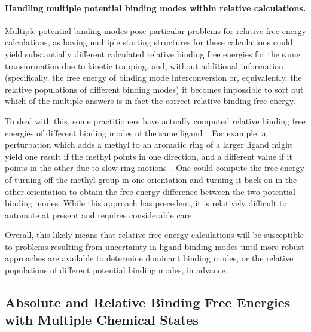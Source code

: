 \documentclass[9pt,bestpractices]{livecoms}
\begin{document}
\paragraph{Handling multiple potential binding modes within relative calculations.}
Multiple potential binding modes pose particular problems for relative free energy calculations, as having multiple starting structures for these calculations could yield substantially different calculated relative binding free energies for the same transformation due to kinetic trapping, and, without additional information (specifically, the free energy of binding mode interconversion or, equivalently, the relative populations of different binding modes) it becomes impossible to sort out which of the multiple answers is in fact the correct relative binding free energy.

To deal with this, some practitioners have actually computed relative binding free energies of different binding modes of the same ligand~\cite{palma2012computation}.
For example, a perturbation which adds a methyl to an aromatic ring of a larger ligand might yield one result if the methyl points in one direction, and a different value if it points in the other due to slow ring motions~\cite{lincoff2016comparing, sasmal2020sampling}.
One could compute the free energy of turning off the methyl group in one orientation and turning it back on in the other orientation to obtain the free energy difference between the two potential binding modes.
While this approach has precedent, it is relatively difficult to automate at present and requires considerable care.

Overall, this likely means that relative free energy calculations will be susceptible to problems resulting from uncertainty in ligand binding modes until more robust approaches are available to determine dominant binding modes, or the relative populations of different potential binding modes, in advance.

\subsection{Absolute and Relative Binding Free Energies with Multiple Chemical States}
\label{sec:multiple-chemical-states}
\end{document}
